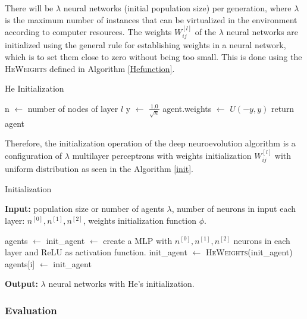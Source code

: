 \documentclass{iosart2c}
\begin{document}
There will be $\lambda$ neural networks (initial population size) per generation, where $\lambda$ is the maximum number of instances that can be virtualized in the environment according to computer resources. The weights $W_{ij}^{[l]}$ of the $\lambda$ neural networks are initialized using the general rule for establishing weights in a neural network, which is to set them close to zero without being too small. This is done using the \textsc{HeWeights} defined in Algorithm \ref{Hefunction}.


\begin{algorithm}[h!]
\caption{He Initialization}\label{Hefunction}
\begin{algorithmic}[1]
\State n $\gets$ number of nodes of layer $l$  
\State y $\gets$ $\frac{1.0}{\sqrt{n}}$
\State agent.weights $\gets$ $U(-y,y)$ 
\State return agent 
\EndFunction
\end{algorithmic}
\end{algorithm}

Therefore, the initialization operation of the deep neuroevolution algorithm is a configuration of $\lambda$ multilayer perceptrons with weights initialization $W_{ij}^{[l]}$ with uniform distribution as seen in the Algorithm \ref{init}.


\begin{algorithm}[h!]
\caption{Initialization}\label{init}
\hspace*{\algorithmicindent} \textbf{Input:} population size or number of agents $\lambda$, number of neurons in input each layer: $n^{[0]}, n^{[1]}, n^{[2]}$, weights initialization function $\phi$.
\begin{algorithmic}[1]
\State agents $\gets$ 
\State init\_agent $\gets$ create a MLP with $n^{[0]}, n^{[1]}, n^{[2]}$ neurons in each layer and ReLU as activation function.
\State init\_agent $\gets$ \textsc{HeWeights}(init\_agent) 
\State agents[i] $\gets$ init\_agent 
\EndFor
\end{algorithmic}
\hspace*{\algorithmicindent} \textbf{Output:} $\lambda$ neural networks with He's initialization.
\end{algorithm}




\subsubsection{Evaluation}\label{evaluacion}
\end{document}
